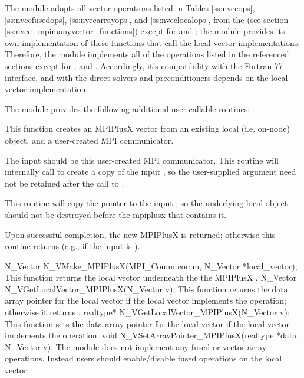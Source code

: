 The {\nvecmpiplusx} module adopts all vector operations listed
in Tables \ref{ss:nvecops}, \ref{ss:nvecfusedops}, \ref{ss:nvecarrayops},
and \ref{ss:nveclocalops}, from the {\nvecmpimanyvector} (see section
\ref{ss:nvec_mpimanyvector_functions}) except for 
and ; the module provides its own implementation
of these functions that call the local vector implementations. Therefore,
the {\nvecmpiplusx} module implements all of the operations listed in the
referenced sections except for , and
. Accordingly, it's compatibility
with the {\sundials} Fortran-77 interface, and with the {\sundials}
direct solvers and preconditioners depends on the local vector implementation.

The module {\nvecmpiplusx} provides the following additional
user-callable routines:
{
  This function creates an MPIPlusX vector from an existing local
  (i.e. on-node) {\nvector} object, and a user-created MPI communicator.

  The input  should be this user-created MPI communicator.
  This routine will internally call  to create a
  copy of the input , so the user-supplied  argument
  need not be retained after the call to .

  This routine will copy the  pointer to the input
  , so the underlying local {\nvector} object
  should not be destroyed before the mpiplusx that contains it.

  Upon successful completion, the new MPIPlusX is returned;
  otherwise this routine returns  (e.g., if the input
   is ).
}
{
  N\_Vector N\_VMake\_MPIPlusX(MPI\_Comm comm, 
  N\_Vector *local\_vector);
}
{
  This function returns the local vector underneath the 
  the MPIPlusX {\nvector}.
}
{
  N\_Vector N\_VGetLocalVector\_MPIPlusX(N\_Vector v);
}
{
  This function returns the data array pointer for the local vector
  if the local vector implements the  operation;
  otherwise it returns .
}
{
  realtype* N\_VGetLocalVector\_MPIPlusX(N\_Vector v);
}
{
  This function sets the data array pointer for the local vector
  if the local vector implements the  operation.
}
{
  void N\_VSetArrayPointer\_MPIPlusX(realtype *data, N\_Vector v);
}
The {\nvecmpiplusx} module does not implement any fused or vector array
operations. Instead users should enable/disable fused operations on the
local vector.
